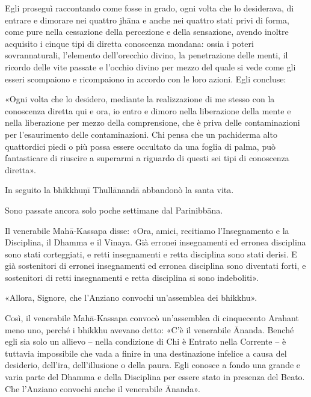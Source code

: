 Egli proseguì raccontando come fosse in grado, ogni
volta che lo desiderava, di entrare e dimorare nei quattro jhāna e anche nei
quattro stati privi di forma, come pure nella cessazione della percezione e
della sensazione, avendo inoltre acquisito i cinque tipi di diretta conoscenza
mondana: ossia i poteri sovrannaturali, l’elemento dell’orecchio divino, la
penetrazione delle menti, il ricordo delle vite passate e l’occhio divino per
mezzo del quale si vede come gli esseri scompaiono e ricompaiono in accordo con
le loro azioni. Egli concluse:

 «Ogni volta che lo desidero, mediante la realizzazione di me
stesso con la conoscenza diretta qui e ora, io entro e dimoro nella liberazione
della mente e nella liberazione per mezzo della comprensione, che è priva delle
contaminazioni per l’esaurimento delle contaminazioni. Chi pensa che un
pachiderma alto quattordici piedi o più possa essere occultato da una foglia di
palma, può fantasticare di riuscire a superarmi a riguardo di questi sei tipi di
conoscenza diretta».

In seguito la bhikkhuṇī Thullānandā abbandonò la santa vita.


 Sono passate ancora solo poche settimane dal
Parinibbāna.

 Il venerabile Mahā-Kassapa disse: «Ora, amici, recitiamo
l’Insegnamento e la Disciplina, il Dhamma e il Vinaya. Già erronei insegnamenti
ed erronea disciplina sono stati corteggiati, e retti insegnamenti e retta
disciplina sono stati derisi. E già sostenitori di erronei insegnamenti ed
erronea disciplina sono diventati forti, e sostenitori di retti insegnamenti e
retta disciplina si sono indeboliti».

«Allora, Signore, che l’Anziano convochi un’assemblea dei bhikkhu».

Così, il venerabile Mahā-Kassapa convocò un’assemblea di cinquecento Arahant
meno uno, perché i bhikkhu avevano detto: «C’è il venerabile Ānanda. Benché egli
sia solo un allievo – nella condizione di Chi è Entrato nella Corrente – è
tuttavia impossibile che vada a finire in una destinazione infelice a causa del
desiderio, dell’ira, dell’illusione o della paura. Egli conosce a fondo una
grande e varia parte del Dhamma e della Disciplina per essere stato in presenza
del Beato. Che l’Anziano convochi anche il venerabile Ānanda».

